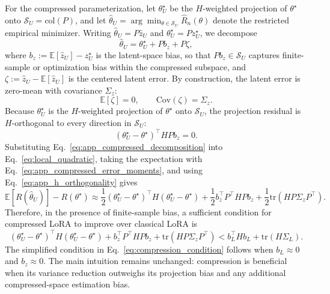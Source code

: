 For the compressed parameterization, let $\theta^\star_U$ be the $H$-weighted projection of $\theta^\star$ onto $\mathcal{S}_U=\mathrm{col}(P)$, and let
$\hat{\theta}_U=\arg\min_{\theta\in\mathcal{S}_U}\widehat R_n(\theta)$
denote the restricted empirical minimizer.
Writing $\hat{\theta}_U=P\hat{z}_U$ and $\theta^\star_U=Pz^\star_U$, we decompose
\begin{equation}
\hat{\theta}_{U}
=
\theta^\star_U
+
Pb_z
+
P\zeta,
\label{eq:app_compressed_decomposition}
\end{equation}
where
$b_z:=\mathbb{E}[\hat{z}_U]-z^\star_U$
is the latent-space bias, so that $Pb_z\in\mathcal{S}_U$ captures finite-sample or optimization bias within the compressed subspace, and
$\zeta:=\hat{z}_U-\mathbb{E}[\hat{z}_U]$
is the centered latent error.
By construction, the latent error is zero-mean with covariance $\Sigma_z$:
\begin{equation}
\mathbb{E}[\zeta]=0,
\qquad
\mathrm{Cov}(\zeta)=\Sigma_z.
\label{eq:app_compressed_error_moments}
\end{equation}
Because $\theta^\star_U$ is the $H$-weighted projection of $\theta^\star$ onto $\mathcal{S}_U$, the projection residual is $H$-orthogonal to every direction in $\mathcal{S}_U$:
\begin{equation}
(\theta^\star_U-\theta^\star)^\top HPb_z=0.
\label{eq:app_h_orthogonality}
\end{equation}
Substituting Eq.~\eqref{eq:app_compressed_decomposition} into Eq.~\eqref{eq:local_quadratic}, taking the expectation with Eq.~\eqref{eq:app_compressed_error_moments}, and using Eq.~\eqref{eq:app_h_orthogonality} gives
\begin{equation}
\mathbb{E}[R(\hat{\theta}_{U})]-R(\theta^\star) \approx \frac{1}{2}(\theta^\star_U-\theta^\star)^\top H (\theta^\star_U-\theta^\star) + \frac{1}{2}b_z^\top P^\top HPb_z + \frac{1}{2}\mathrm{tr}(HP\Sigma_zP^\top).
\label{eq:app_compressed_excess_risk_general}
\end{equation}
Therefore, in the presence of finite-sample bias, a sufficient condition for compressed LoRA to improve over classical LoRA is
\begin{equation}
(\theta^\star_U-\theta^\star)^\top H (\theta^\star_U-\theta^\star) + b_z^\top P^\top HPb_z + \mathrm{tr}(HP\Sigma_zP^\top) < b_L^\top Hb_L + \mathrm{tr}(H\Sigma_L).
\label{eq:app_compression_condition_general}
\end{equation}
The simplified condition in Eq.~\eqref{eq:compression_condition} follows when $b_L\approx 0$ and $b_z\approx 0$.
The main intuition remains unchanged: compression is beneficial when its variance reduction outweighs its projection bias and any additional compressed-space estimation bias.

